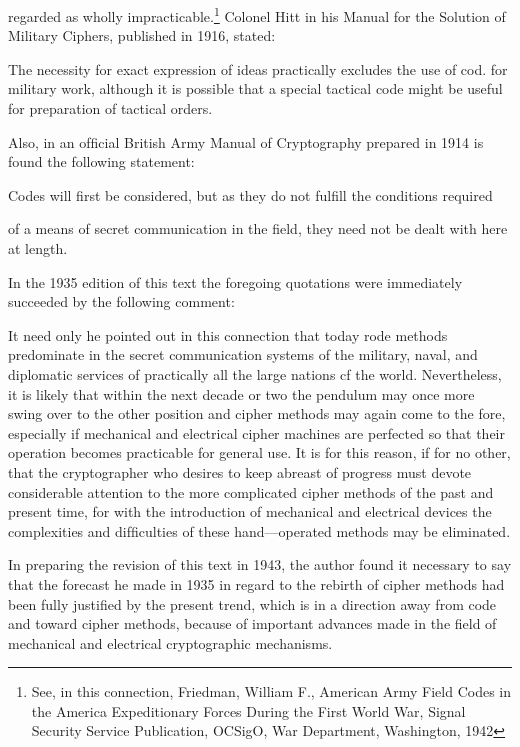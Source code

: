 regarded as wholly impracticable.\footnote{See, in this connection, Friedman, William F., American Army Field Codes in the America Expeditionary Forces During the First World War, Signal Security Service Publication, OCSigO, War Department, Washington, 1942} Colonel Hitt in his Manual for the Solution of Military Ciphers, published in 1916, stated:

The necessity for exact expression of ideas practically excludes the use of cod.
for military work, although it is possible that a special tactical code might be
useful for preparation of tactical orders.

Also, in an ofﬁcial British Army Manual of Cryptography prepared in
1914 is found the following statement:

Codes will ﬁrst be considered, but as they do not fulﬁll the conditions required

of a means of secret communication in the ﬁeld, they need not be dealt with here
at length.

In the 1935 edition of this text the foregoing quotations were immediately succeeded by the following comment:

It need only he pointed out in this connection that today rode methods predominate in the secret communication systems of the military, naval, and diplomatic
services of practically all the large nations cf the world. Nevertheless, it is likely
that within the next decade or two the pendulum may once more swing over to the
other position and cipher methods may again come to the fore, especially if
mechanical and electrical cipher machines are perfected so that their operation
becomes practicable for general use. It is for this reason, if for no other, that the
cryptographer who desires to keep abreast of progress must devote considerable
attention to the more complicated cipher methods of the past and present time,
for with the introduction of mechanical and electrical devices the complexities and
difﬁculties of these hand—operated methods may be eliminated.

In preparing the revision of this text in 1943, the author found it necessary to say that the forecast he made in 1935 in regard to the rebirth of
cipher methods had been fully justiﬁed by the present trend, which is in
a direction away from code and toward cipher methods, because of
important advances made in the ﬁeld of mechanical and electrical cryptographic mechanisms.

